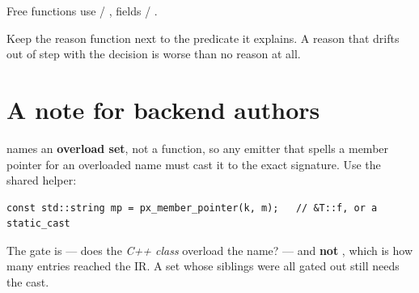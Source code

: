 Free functions use  / ,
fields  / .

\begin{note}
Keep the reason function next to the predicate it explains. A reason that drifts
out of step with the decision is worse than no reason at all.
\end{note}

\section{A note for backend authors}

 names an \textbf{overload set}, not a function, so any emitter
that spells a member pointer for an overloaded name must cast it to the exact
signature. Use the shared helper:

\begin{lstlisting}[style=cpp]
const std::string mp = px_member_pointer(k, m);   // &T::f, or a static_cast
\end{lstlisting}

The gate is  --- does the \emph{C++ class}
overload the name? --- and \textbf{not} , which is how
many entries reached the IR. A set whose siblings were all gated out still needs
the cast.
